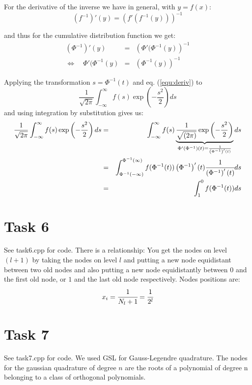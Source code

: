 \documentclass[]{article}
\begin{document}
For the derivative of the inverse we have in general, with $y = f(x)$:
\[\left(f^{-1}\right)'(y) = \left(f'\left(f^{-1}(y)\right)\right)^{-1}\]

and thus for the cumulative distribution function we get:
\begin{eqnarray}
\left(\Phi^{-1}\right)'(y) & = &
\left(\Phi'(\Phi^{-1}(y)\right)^{-1} \nonumber\\
\Leftrightarrow \quad \Phi'(\Phi^{-1}(y) & = & \left(\Phi^{-1}(y)\right)^{-1}
\label{equ:deriv}
\end{eqnarray}

Applying the transformation $s = \Phi^{-1}(t)$ and eq. (\ref{equ:deriv}) to 
\[\dfrac{1}{\sqrt{2\pi}}\int_{-\infty}^{\infty}f(s)\exp\left({-\dfrac{s^2}{2}}\right)ds\]
and using integration by substitution gives us:
\begin{eqnarray*}
\dfrac{1}{\sqrt{2\pi}}\int_{-\infty}^{\infty}f(s)\exp\left({-\dfrac{s^2}{2}}\right)ds
& = &
\int_{-\infty}^{\infty}f(s)\underbrace{\dfrac{1}{\sqrt{(2\pi)}}\exp\left({-\dfrac{s^2}{2}}\right)}_{\Phi'(\Phi^{-1})(t)
= \frac{1}{\left(\Phi^{-1}\right)'(t)}}ds \\
& =
&\int_{\Phi^{-1}(-\infty)}^{\Phi^{-1}(\infty)}f(\Phi^{-1}(t))\left(\Phi^{-1}\right)'(t)\cfrac{1}{\left(\Phi^{-1}\right)'(t)}ds
\\
& = &
\int_{1}^{0}f(\Phi^{-1}(t))ds
\end{eqnarray*}

\section*{Task 6} See task6.cpp for code. There is a relationship: You get the
nodes on level $(l+1)$ by taking the nodes on level $l$ and putting a new node
equidistant between two old nodes and also putting a new node equidistantly
between $0$ and the first old node, or $1$ and the last old node respectively.
Nodes positions are:
\begin{eqnarray*}
x_i = \cfrac{1}{N_l+1} = \cfrac{1}{2^l}
\end{eqnarray*}

\section*{Task 7}
See task7.cpp for code. We used GSL for Gauss-Legendre quadrature. The nodes for
the gaussian quadrature of degree $n$ are the roots of a polynomial of degree n
belonging to a class of orthogonal polynomials.
\end{document}
